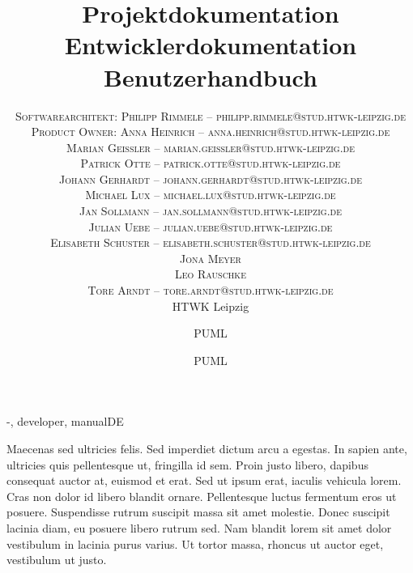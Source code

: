 \documentclass[twoside]{report}
\title{\vspace{-5mm}%
	\fontsize{24pt}{10pt}\selectfont
	\textbf{Projektdokumentation}
	}
\author{%
	\large
	\textsc{Softwarearchitekt: Philipp Rimmele -- philipp.rimmele@stud.htwk-leipzig.de} \\[2mm]
	\textsc{Product Owner: Anna Heinrich -- anna.heinrich@stud.htwk-leipzig.de} \\[2mm]
	\textsc{Marian Geißler -- marian.geissler@stud.htwk-leipzig.de} \\[2mm]
	\textsc{Patrick Otte -- patrick.otte@stud.htwk-leipzig.de} \\[2mm]
	\textsc{Johann Gerhardt -- johann.gerhardt@stud.htwk-leipzig.de} \\[2mm]
	\textsc{Michael Lux -- michael.lux@stud.htwk-leipzig.de}	\\[2mm]	
	\textsc{Jan Sollmann -- jan.sollmann@stud.htwk-leipzig.de} \\[2mm]
	\textsc{Julian Uebe -- julian.uebe@stud.htwk-leipzig.de} \\[2mm]
	\textsc{Elisabeth Schuster -- elisabeth.schuster@stud.htwk-leipzig.de} \\[2mm]		
	\textsc{Jona Meyer}	\\[2mm]	
	\textsc{Leo Rauschke}	\\[2mm]
	\textsc{Tore Arndt -- tore.arndt@stud.htwk-leipzig.de} \\[2mm]
	\normalsize	HTWK Leipzig 
	}
\date{}
\title{\vspace{-5mm}%
	\fontsize{24pt}{10pt}\selectfont
	\textbf{Entwicklerdokumentation}
	}
\author{%
	\large
	\textsc{PUML} \\[2mm]
	}
\date{}
\title{\vspace{-5mm}%
	\fontsize{24pt}{10pt}\selectfont
	\textbf{Benutzerhandbuch}
	}
\author{%
	\large
	\textsc{PUML} \\[2mm]
	}
\date{}
\begin{document}

\maketitle
\thispagestyle{fancy}

\tableofcontents


\begin{shownto}{-, developer, manualDE}


Maecenas sed ultricies felis. Sed imperdiet dictum arcu a egestas. 
In sapien ante, ultricies quis pellentesque ut, fringilla id sem. Proin justo libero, dapibus consequat auctor at, euismod et erat. Sed ut ipsum erat, iaculis vehicula lorem. Cras non dolor id libero blandit ornare. Pellentesque luctus fermentum eros ut posuere. Suspendisse rutrum suscipit massa sit amet molestie. Donec suscipit lacinia diam, eu posuere libero rutrum sed. Nam blandit lorem sit amet dolor vestibulum in lacinia purus varius. Ut tortor massa, rhoncus ut auctor eget, vestibulum ut justo.
\nsecend












\nsecend





\end{shownto}
\end{document}
